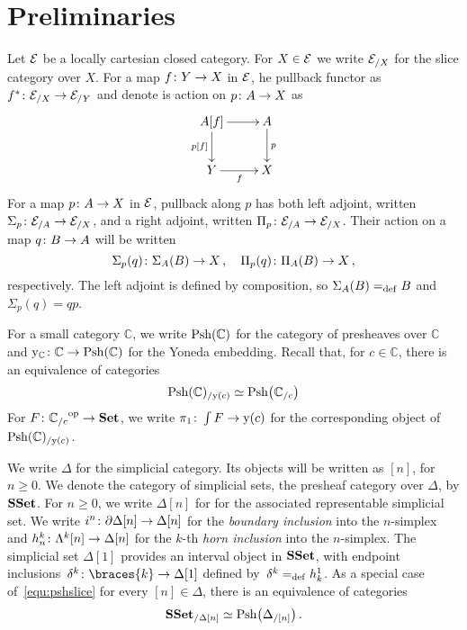 \documentclass[reqno,10pt,a4paper,oneside,draft]{amsart}
\begin{document}
\section{Preliminaries} 

Let $\mathcal{E}$  be a locally cartesian closed category. For $X \in \mathcal{E}$ we write $\mathcal{E}_{/X}$ for the slice category over $X$. For a map $f \colon Y \to X$ in $\mathcal{E}$, he pullback functor as $f^* \colon \mathcal{E}_{/X} \to \mathcal{E}_{/Y}$
and denote is action on $p \colon A \to X$ as 
\[
\xymatrix{
A[f] \ar[r] \ar[d]_{p[f]} & A \ar[d]^p \\
Y \ar[r]_f & X }
\]
For a map $p \colon A \to X$ in $\mathcal{E}$, pullback along $p$ has both left adjoint, written $\Sigma_p \colon \mathcal{E}_{/A}
\to \mathcal{E}_{/X}$, and a right adjoint, written $\Pi_p \colon \mathcal{E}_{/A} \to \mathcal{E}_{/X}$. Their action on a
map $q \colon B \to A$ will be written
\[
 \Sigma_p(q) \colon \Sigma_A(B) \to X \, , \quad \Pi_p(q) \colon \Pi_A(B) \to X \, ,
 \]
respectively. The left adjoint is defined by composition, so $\Sigma_A(B) =_{\operatorname{def}} B$ and $\Sigma_p(q) = qp$.

\medskip
For a small category $\mathbb{C}$, we write $\mathrm{Psh}(\mathbb{C})$ for the category of presheaves over $\mathbb{C}$ and $\mathrm{y}_\mathbb{C} \colon \mathbb{C} \to \mathrm{Psh}(\mathbb{C})$ for the Yoneda embedding. 
Recall that, for $c \in \mathbb{C}$, there is an equivalence of categories
\begin{equation}
\label{equ:pshslice}
\mathrm{Psh}(\mathbb{C})_{/ \mathrm{y}(c)} \simeq \mathrm{Psh} \big(  \mathbb{C}_{/c}  \big )
\end{equation}
For $F \colon {\mathbb{C}_{/c}}^{\operatorname{op}} \to \mathbf{Set}$, we write $\pi_1 \colon \int F \to \mathrm{y}(c)$
for the corresponding object of~$\mathrm{Psh}(\mathbb{C})_{/ \mathrm{y}(c)}$.


\medskip



\medskip




We write $\Delta$ for the simplicial category. Its objects will be written as $[n]$, for $n \geq 0$. We denote
the category of simplicial sets, \ie the presheaf category over $\Delta$, by $\mathbf{SSet}$. 
 For $n \geq 0$, we write $\Delta[n]$ for for the
associated representable simplicial set. We write $i^n \colon  \partial \Delta[n] \to \Delta[n]$ for the \emph{boundary inclusion} into the $n$-simplex and  $h^k_n  \colon \Lambda^k[n] \to \Delta[n]$ for the $k$-th \emph{horn inclusion} into the $n$-simplex. The simplicial set $\Delta[1]$ provides an interval object in $\mathbf{SSet}$, with endpoint inclusions~$\kcyl \co \braces{ k} \to \Delta[1]$ defined by~$\delta^k =_{\operatorname{def}} h^1_k$.
As a special case of~\eqref{equ:pshslice} for every $[n] \in \Delta$, there is an equivalence of categories
\begin{equation}
\label{equ:psh-slice-sset}
\mathbf{SSet}_{/\Delta[n]} \simeq \mathrm{Psh} \big( \Delta_{/[n]} \big ) \, .
\end{equation}
\end{document}
